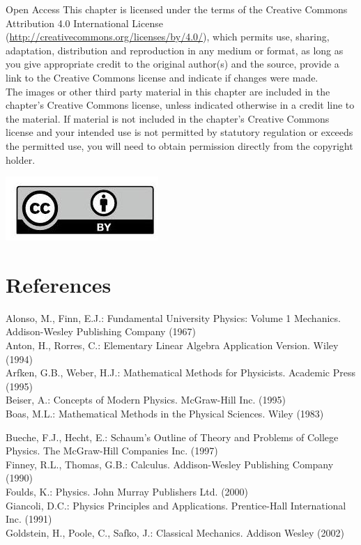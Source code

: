 \documentclass[10pt]{article}
\begin{document}
Open Access This chapter is licensed under the terms of the Creative Commons Attribution 4.0 International License (\href{http://creativecommons.org/licenses/by/4.0/}{http://creativecommons.org/licenses/by/4.0/}), which permits use, sharing, adaptation, distribution and reproduction in any medium or format, as long as you give appropriate credit to the original author(s) and the source, provide a link to the Creative Commons license and indicate if changes were made.\\
The images or other third party material in this chapter are included in the chapter's Creative Commons license, unless indicated otherwise in a credit line to the material. If material is not included in the chapter's Creative Commons license and your intended use is not permitted by statutory regulation or exceeds the permitted use, you will need to obtain permission directly from the copyright holder.

\begin{center}
\includegraphics[max width=\textwidth]{2024_09_13_db1f357d2aad0a03eb2eg-178}
\end{center}

\section*{References}
Alonso, M., Finn, E.J.: Fundamental University Physics: Volume 1 Mechanics. Addison-Wesley Publishing Company (1967)\\
Anton, H., Rorres, C.: Elementary Linear Algebra Application Version. Wiley (1994)\\
Arfken, G.B., Weber, H.J.: Mathematical Methods for Physicists. Academic Press (1995)\\
Beiser, A.: Concepts of Modern Physics. McGraw-Hill Inc. (1995)\\
Boas, M.L.: Mathematical Methods in the Physical Sciences. Wiley (1983)

Bueche, F.J., Hecht, E.: Schaum's Outline of Theory and Problems of College Physics. The McGraw-Hill Companies Inc. (1997)\\
Finney, R.L., Thomas, G.B.: Calculus. Addison-Wesley Publishing Company (1990)\\
Foulds, K.: Physics. John Murray Publishers Ltd. (2000)\\
Giancoli, D.C.: Physics Principles and Applications. Prentice-Hall International Inc. (1991)\\
Goldstein, H., Poole, C., Safko, J.: Classical Mechanics. Addison Wesley (2002)
\end{document}
